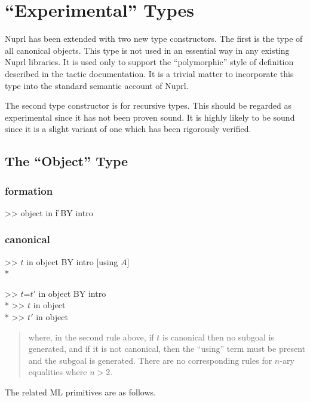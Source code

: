 \chapter{``Experimental'' Types}

\label{experimental-types}

Nuprl has been extended with two new type constructors.  The first is the
type of all canonical objects.  This type is not used in an essential way
in any existing Nuprl libraries.  It is used only to support the
``polymorphic'' style of definition described in the tactic documentation.
It is a trivial matter to incorporate this type into the standard semantic
account of Nuprl.

The second type constructor is for recursive types.  This should be
regarded as experimental since it has not been proven sound.  It is highly
likely to be sound since it is a slight variant of one which has been
rigorously verified.

\section{The ``Object'' Type}
\subsection*{formation}
\goal >> object in \U{i}  BY intro

\subsection*{canonical}
\goalgroup >> $t$ in object  BY intro [using $A$]\\*
\subgoal  [>> $t$ in $A$]


\goalskip

\goal >> $t$=$t'$ in object BY intro\\*
\subgoal  >> $t$ in object\\*
\subgoal  >> $t'$ in object
\begin{quote}\rm
where, in the second rule above, if $t$ 
is canonical then no subgoal is generated, and
if it is not canonical, then the ``using'' term must be present and the
subgoal is generated.  There are no corresponding rules for $n$-ary
equalities where $n>2$.
\end{quote}

\rm

The related ML primitives are as follows.



